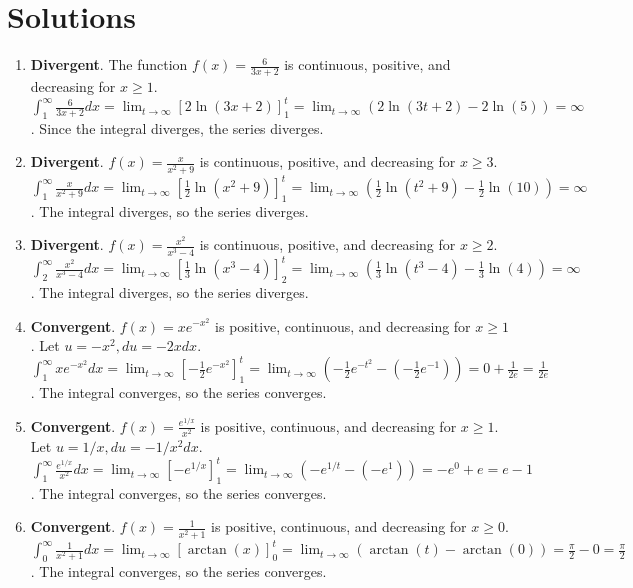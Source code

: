\documentclass[12pt]{article}
\begin{document}
\section*{Solutions}
\begin{enumerate}
    \item \textbf{Divergent}. The function $f(x) = \frac{6}{3x+2}$ is continuous, positive, and decreasing for $x \ge 1$.
    $\int_{1}^{\infty} \frac{6}{3x+2} dx = \lim_{t \to \infty} [2\ln(3x+2)]_{1}^{t} = \lim_{t \to \infty} (2\ln(3t+2) - 2\ln(5)) = \infty$. Since the integral diverges, the series diverges.

    \item \textbf{Divergent}. $f(x) = \frac{x}{x^2+9}$ is continuous, positive, and decreasing for $x \ge 3$.
    $\int_{1}^{\infty} \frac{x}{x^2+9} dx = \lim_{t \to \infty} [\frac{1}{2}\ln(x^2+9)]_{1}^{t} = \lim_{t \to \infty} (\frac{1}{2}\ln(t^2+9) - \frac{1}{2}\ln(10)) = \infty$. The integral diverges, so the series diverges.

    \item \textbf{Divergent}. $f(x) = \frac{x^2}{x^3-4}$ is continuous, positive, and decreasing for $x \ge 2$.
    $\int_{2}^{\infty} \frac{x^2}{x^3-4} dx = \lim_{t \to \infty} [\frac{1}{3}\ln(x^3-4)]_{2}^{t} = \lim_{t \to \infty} (\frac{1}{3}\ln(t^3-4) - \frac{1}{3}\ln(4)) = \infty$. The integral diverges, so the series diverges.

    \item \textbf{Convergent}. $f(x) = xe^{-x^2}$ is positive, continuous, and decreasing for $x \ge 1$. Let $u = -x^2, du = -2x dx$.
    $\int_{1}^{\infty} xe^{-x^2} dx = \lim_{t \to \infty} [-\frac{1}{2}e^{-x^2}]_{1}^{t} = \lim_{t \to \infty} (-\frac{1}{2}e^{-t^2} - (-\frac{1}{2}e^{-1})) = 0 + \frac{1}{2e} = \frac{1}{2e}$. The integral converges, so the series converges.
    
    \item \textbf{Convergent}. $f(x) = \frac{e^{1/x}}{x^2}$ is positive, continuous, and decreasing for $x \ge 1$. Let $u = 1/x, du = -1/x^2 dx$.
    $\int_{1}^{\infty} \frac{e^{1/x}}{x^2} dx = \lim_{t \to \infty} [-e^{1/x}]_{1}^{t} = \lim_{t \to \infty} (-e^{1/t} - (-e^{1})) = -e^0 + e = e-1$. The integral converges, so the series converges.
    
    \item \textbf{Convergent}. $f(x) = \frac{1}{x^2+1}$ is positive, continuous, and decreasing for $x \ge 0$.
    $\int_{0}^{\infty} \frac{1}{x^2+1} dx = \lim_{t \to \infty} [\arctan(x)]_{0}^{t} = \lim_{t \to \infty} (\arctan(t) - \arctan(0)) = \frac{\pi}{2} - 0 = \frac{\pi}{2}$. The integral converges, so the series converges.


\end{enumerate}
\end{document}
